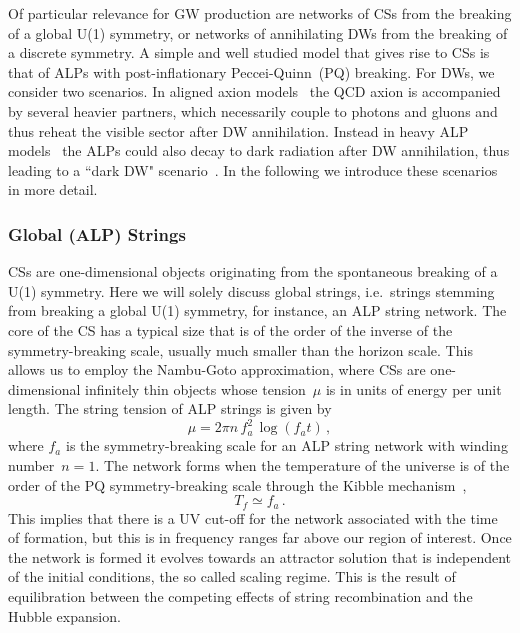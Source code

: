 \documentclass{article}
\begin{document}
Of particular relevance for GW production are networks of CSs from the breaking of a global U(1) symmetry, or networks of annihilating DWs from the breaking of a discrete symmetry. 
A simple and well studied model that gives rise to CSs is that of 
ALPs with post-inflationary Peccei-Quinn~(PQ) breaking. For DWs, we consider two scenarios. In aligned axion models~\cite{Higaki:2016jjh,Chiang:2020aui} the QCD axion is accompanied by several heavier partners, which necessarily couple to photons and gluons and thus reheat the visible sector after DW annihilation. Instead in heavy ALP models~\cite{Blasi:2022ayo} the ALPs could also decay to dark radiation after DW annihilation, thus leading to a ``dark DW" scenario~\cite{Babichev:2021uvl}. In the following we introduce these scenarios in more detail. 

%
\subsubsection{Global (ALP) Strings} 
\label{sec: Global strings}
%

CSs are one-dimensional objects originating from the spontaneous breaking of a U(1) symmetry. Here we will solely discuss global strings, i.e.\ strings stemming from breaking a global U(1) symmetry, for instance, an ALP string network. The core of the CS has a typical size that is of the order of the inverse of the symmetry-breaking scale, usually much smaller than the horizon scale. This allows us to employ the Nambu-Goto approximation, where CSs are one-dimensional infinitely thin objects whose tension~$\mu$ is in units of energy per unit length. The string tension of ALP strings is given by 
\begin{equation}
 \mu = 2 \pi n\, f_{a}^{2} \, \log (f_{a} t) \, ,
\end{equation}  
where $f_{a}$ is the symmetry-breaking scale for an ALP string network with winding number~$n=1$. 
The network forms when the temperature of the universe is of the order of the PQ symmetry-breaking scale through the Kibble mechanism~\cite{Kibble:1976sj},
\begin{equation}
    T_{f} \simeq f_{a}\,.
\end{equation}
This implies that there is a UV cut-off for the network associated with the time of formation, but this is in frequency ranges far above our region of interest. 
Once the network is formed it evolves towards an attractor solution that is independent of the initial conditions, the so called scaling regime. This is the result of equilibration between the competing effects of string recombination and the Hubble expansion. 
\end{document}
